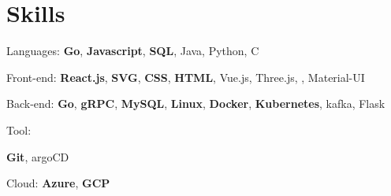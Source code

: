 \documentclass[letterpaper,11pt]{article}
\newcommand{\resumeSubHeadingListStart}{\begin{itemize}[leftmargin=0.15in, label={}]}
\newcommand{\resumeSubHeadingListEnd}{\end{itemize}}
\begin{document}

\section{Skills}
  \vspace{2pt}
  \resumeSubHeadingListStart
    \small{\item{
        
        {Languages:}{ \textbf{Go}, \textbf{Javascript}, \textbf{SQL}, Java, Python, C} \\ \vspace{3pt}

        {Front-end:}{ \textbf{React.js}, \textbf{SVG}, \textbf{CSS}, \textbf{HTML},  Vue.js, Three.js, , Material-UI} \\ \vspace{3pt}

        {Back-end:}{ \textbf{Go}, \textbf{gRPC}, \textbf{MySQL}, \textbf{Linux}, \textbf{Docker}, \textbf{Kubernetes}, kafka, Flask} \\ \vspace{3pt}

        {Tool:}{ \textbf{Git}, argoCD \\ \vspace{3pt}
        
        {Cloud:}{ \textbf{Azure}, \textbf{GCP}} \\ \vspace{3pt}
        
    }}}
  \resumeSubHeadingListEnd



\end{document}
